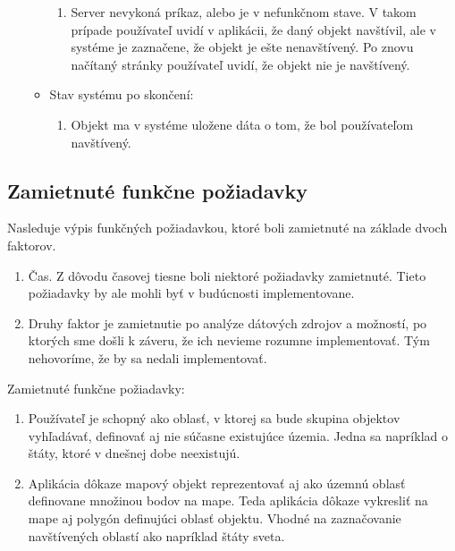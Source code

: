 \begin{itemize}
\begin{itemize}
                        \begin{enumerate}
                              \item Server nevykoná príkaz, alebo je v nefunkčnom stave. V takom prípade používateľ uvidí v aplikácii, že daný objekt navštívil,
                                    ale v systéme je zaznačene, že objekt je ešte nenavštívený. Po znovu načítaný stránky používateľ uvidí, že objekt nie je navštívený.
                        \end{enumerate}
                  \item Stav systému po skončení:
                        \begin{enumerate}
                              \item Objekt ma v systéme uložene dáta o tom, že bol používateľom navštívený.
                        \end{enumerate}
            \end{itemize}
\end{itemize}



\subsection{Zamietnuté funkčne požiadavky }
Nasleduje výpis funkčných požiadavkou, ktoré boli zamietnuté na základe dvoch faktorov.

\begin{enumerate}
      \item Čas. Z dôvodu časovej tiesne boli niektoré požiadavky zamietnuté.
            Tieto požiadavky by ale mohli byť v budúcnosti implementovane.
      \item Druhy faktor je zamietnutie po analýze
            dátových zdrojov a možností, po ktorých sme došli k záveru, že ich nevieme rozumne
            implementovať. Tým nehovoríme, že by sa nedali implementovať.
\end{enumerate}

Zamietnuté funkčne požiadavky:

\begin{enumerate}
      \item Používateľ je schopný ako oblasť, v ktorej sa bude skupina objektov vyhľadávať, definovať aj nie súčasne existujúce územia.
            Jedna sa napríklad o štáty, ktoré v dnešnej dobe neexistujú.
      \item Aplikácia dôkaze mapový objekt reprezentovať aj ako územnú oblasť definovane množinou bodov na mape.
            Teda aplikácia dôkaze vykresliť na mape aj polygón definujúci oblasť objektu.
            Vhodné na zaznačovanie navštívených oblastí ako napríklad štáty sveta.
\end{enumerate}


